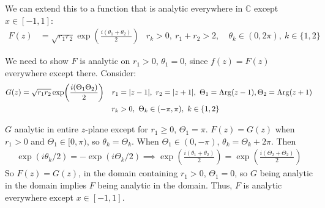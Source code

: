\documentclass[12pt, english]{book}
\begin{document}
\begin{example}
\begin{figure}[H]
		\end{figure}
	
		We can extend this to a function that is analytic everywhere in \(\mathbb{C}\) except \(x \in [-1, 1]\):
		\begin{align*}
			F(z) &= \sqrt{r_1 r_2} \exp(\frac{i(\theta_1 + \theta_2)}{2}) &
				r_k > 0, \ r_1 + r_2 > 2, &\ \theta_k \in (0, 2\pi), \ k \in \{1,2\}
		\end{align*}
	
		We need to show \(F\) is analytic on \(r_1>0\), \(\theta_1 =0\), since \(f(z) = F(z)\) everywhere except there. Consider:
		\begin{align*}
			G(z) &= \sqrt{r_1 r_2} \exp(\frac{i(\Theta_1 \Theta_2)}{2})	&
				r_1 &= \abs{z-1}, \ r_2 = \abs{z+1}, \ \Theta_1 = \operatorname{Arg}(z-1), \Theta_2 = \operatorname{Arg}(z+1) \\
			&&
				r_k &> 0, \ \Theta_k \in (-\pi, \pi), \ k \in \{1,2\}
		\end{align*}
			
		\(G\) analytic in entire \(z\)-plane except for \(r_1 \geq 0\), \(\Theta_1 = \pi\). \(F(z) = G(z)\) when \(r_1 >0\) and \(\Theta_1 \in [0,\pi)\), so \(\theta_k = \Theta_k\). When \(\Theta_1 \in (0, -\pi)\), \(\theta_k = \Theta_k + 2\pi\).
		Then
		\begin{align*}
			\exp(i\theta_k/2) = -\exp(i\Theta_k/2) 
			\implies \exp(\frac{i(\theta_1 + \theta_2)}{2}) = \exp(\frac{i(\Theta_2 + \Theta_2)}{2})
		\end{align*}
		So \(F(z) = G(z)\), in the domain containing \(r_1 > 0\), \(\Theta_1 = 0\), so \(G\) being analytic in the domain implies \(F\) being analytic in the domain. Thus, \(F\) is analytic everywhere except \(x \in [-1, 1]\).
		

\end{example}
\end{document}
